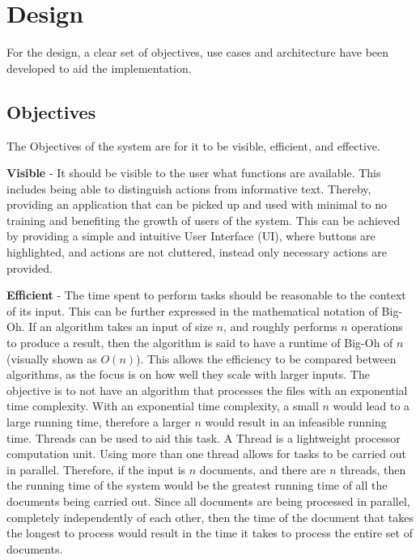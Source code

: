 \chapter{Design}
\par For the design, a clear set of objectives, use cases and architecture have been developed to aid the implementation.
\section{Objectives}
\par The Objectives of the system are for it to be visible, efficient, and effective.
\par \textbf{Visible} -  It should be visible to the user what  functions are available. This includes being able to distinguish actions from informative text. Thereby, providing an application that can be picked up and used with minimal to no training and benefiting the growth of users of the system. This can be achieved by providing a simple and intuitive User Interface (UI), where buttons are highlighted, and actions are not cluttered, instead only necessary actions are provided. 

\par \textbf{Efficient} - The time spent to perform tasks should be reasonable to the context of its input. This can be further expressed in the mathematical notation of Big-Oh. If an algorithm takes an input of size $n$, and roughly performs $n$ operations to produce a result, then the algorithm is said to have a runtime of Big-Oh of $n$ (visually shown as $O(n)$). This allows the efficiency to be compared between algorithms, as the focus is on how well they scale with larger inputs. The objective is to not have an algorithm that processes the files with an exponential time complexity. With an exponential time complexity, a small $n$ would lead to a large running time, therefore a larger $n$ would result in an infeasible running time. Threads can be used to aid this task. A Thread is a lightweight processor computation unit. Using more than one thread allows for tasks to be carried out in parallel. Therefore, if the input is $n$ documents, and there are $n$ threads, then the running time of the system would be the greatest running time of all the documents being carried out. Since all documents are being processed in parallel, completely independently of each other, then the time of the document that takes the longest to process would result in the time it takes to process the entire set of documents.

